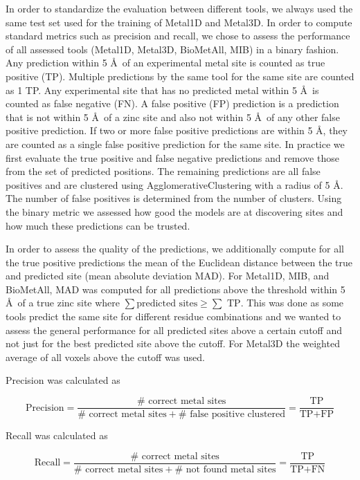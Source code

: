 \documentclass[  ASAPversion,
  ,
  9pt]{elife}
\begin{document}
In order to standardize the evaluation between different tools, we always used the same test set used for the training of Metal1D and Metal3D. In order to compute standard metrics such as precision and recall, we chose to assess the performance of all assessed tools (Metal1D, Metal3D, BioMetAll, MIB) in a binary fashion. Any prediction within 5 \AA\, of an experimental metal site is counted as true positive (TP). Multiple predictions by the same tool for the same site are counted as 1 TP. Any experimental site that has no predicted metal within 5 \AA\, is counted as false negative (FN). A false positive (FP) prediction is a prediction that is not within 5 \AA\, of a zinc site and also not within 5 \AA\, of any other false positive prediction. If two or more false positive predictions are within 5 \AA , they are counted as a single false positive prediction for the same site. In practice we first evaluate the true positive and false negative predictions and remove those from the set of predicted positions. The remaining predictions are all false positives and are clustered using AgglomerativeClustering with a radius of 5 \AA . The number of false positives is determined from the number of clusters. Using the binary metric we assessed how good the models are at discovering sites and how much these predictions can be trusted.

In order to assess the quality of the predictions, we additionally compute for all the true positive predictions the mean of the Euclidean distance between the true and predicted site (mean absolute deviation MAD). For Metal1D, MIB, and BioMetAll, MAD was computed for all predictions above the threshold within 5 \AA\, of a true zinc site where \(\sum\text{predicted sites} \geq \sum\text{ TP}\). This was done as some tools predict the same site for different residue combinations and we wanted to assess the general performance for all predicted sites above a certain cutoff and not just for the best predicted site above the cutoff. For Metal3D the weighted average of all voxels above the cutoff was used.

Precision was calculated as

\[
\text{Precision} =\frac{\#\text{ correct metal sites}}{\#\text{ correct metal sites} + \#\text{ false positive clustered}} = \frac{\text{TP}}{\text{TP}+\text{FP}}
\]

Recall was calculated as

\[
\text{Recall} =\frac{\#\text{ correct metal sites}}{\#\text{ correct metal sites} + \#\text{ not found metal sites}}  = \frac{\text{TP}}{\text{TP}+\text{FN}}
\]
\end{document}
